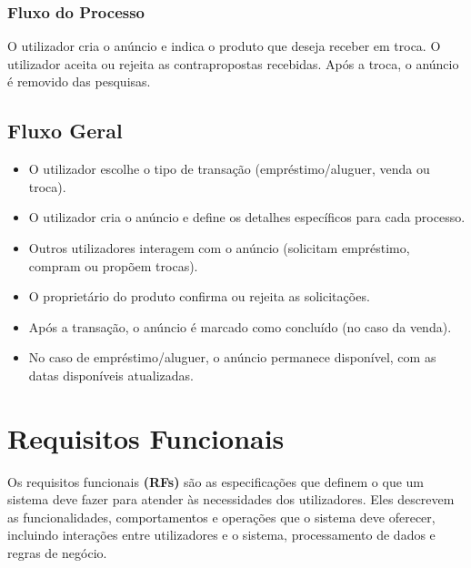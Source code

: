 \documentclass[a4paper, 12pt]{article} %
\begin{document}
\subsubsection{Fluxo do Processo}
O utilizador cria o anúncio e indica o produto que deseja receber em troca. O utilizador aceita ou rejeita as contrapropostas recebidas. Após a troca, o anúncio é removido das pesquisas.

\subsection{Fluxo Geral}
\begin{itemize}
	\item O utilizador escolhe o tipo de transação (empréstimo/aluguer, venda ou troca).
	\item O utilizador cria o anúncio e define os detalhes específicos para cada processo.
	\item Outros utilizadores interagem com o anúncio (solicitam empréstimo, compram ou propõem trocas).
	\item O proprietário do produto confirma ou rejeita as solicitações.
	\item Após a transação, o anúncio é marcado como concluído (no caso da venda).
	\item No caso de empréstimo/aluguer, o anúncio permanece disponível, com as datas disponíveis atualizadas.
\end{itemize}


\newpage
\section{Requisitos Funcionais}
Os requisitos funcionais \textbf{(RFs)} são as especificações que definem o que um sistema deve fazer para atender às necessidades dos utilizadores. Eles descrevem as funcionalidades, comportamentos e operações que o sistema deve oferecer, incluindo interações entre utilizadores e o sistema, processamento de dados e regras de negócio.
\end{document}
